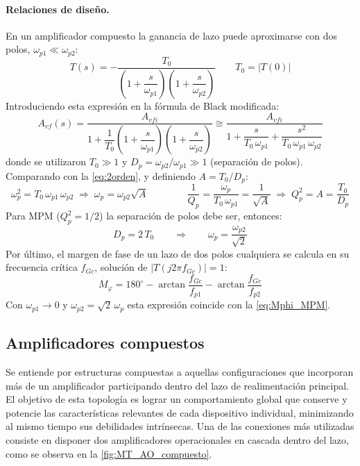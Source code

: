 \paragraph{Relaciones de diseño.} En un amplificador compuesto la ganancia de lazo puede aproximarse con dos polos, $\omega_{p1} \ll \omega_{p2}$:
\begin{equation}
    T(s) = - \frac{T_0}{\left(1 + \dfrac{s}{\omega_{p1}}\right)\left(1 + \dfrac{s}{\omega_{p2}}\right)} \qquad T_0 = |T(0)|
    \label{eq:lazo2polos}
\end{equation}
Introduciendo esta expresión en la fórmula de Black modificada:
\begin{equation}
    A_{vf}(s) = \frac{A_{vfi}}{1 + \dfrac{1}{T_0}\left(1+\dfrac{s}{\omega_{p1}}\right)\left(1+\dfrac{s}{\omega_{p2}}\right)} \cong \frac{A_{vfi}}{1 + \dfrac{s}{T_0\,\omega_{p1}} + \dfrac{s^2}{T_0\,\omega_{p1}\,\omega_{p2}}}
    \label{eq:Avf_dospolos}
\end{equation}
donde se utilizaron $T_0 \gg 1$ y $D_p = \omega_{p2}/\omega_{p1} \gg 1$ (separación de polos). Comparando con la \autoref{eq:2orden}, y definiendo $A = T_0/D_p$:
\begin{equation}
    \omega_p^2 = T_0\,\omega_{p1}\,\omega_{p2} \;\Rightarrow\; \omega_p = \omega_{p2}\sqrt{A} \qquad\qquad \frac{1}{Q_p} = \frac{\omega_p}{T_0\,\omega_{p1}} = \frac{1}{\sqrt{A}} \;\Rightarrow\; Q_p^2 = A = \frac{T_0}{D_p}
    \label{eq:wp_A}
\end{equation}
Para MPM ($Q_p^2 = 1/2$) la separación de polos debe ser, entonces:
\begin{equation}
    D_p = 2\,T_0 \qquad\Rightarrow\qquad \omega_p = \frac{\omega_{p2}}{\sqrt{2}}
    \label{eq:Dp_MPM}
\end{equation}
Por último, el margen de fase de un lazo de dos polos cualquiera se calcula en su frecuencia crítica $f_{Gc}$, solución de $|T(j2\pi f_{Gc})| = 1$:
\begin{equation}
    M_\varphi = 180^\circ - \arctan\frac{f_{Gc}}{f_{p1}} - \arctan\frac{f_{Gc}}{f_{p2}}
    \label{eq:Mphi_2polos}
\end{equation}
Con $\omega_{p1}\to 0$ y $\omega_{p2} = \sqrt{2}\,\omega_p$ esta expresión coincide con la \autoref{eq:Mphi_MPM}.

\subsection{Amplificadores compuestos}

Se entiende por estructuras compuestas a aquellas configuraciones que incorporan más de un amplificador participando dentro del lazo de realimentación principal. El objetivo de esta topología es lograr un comportamiento global que conserve y potencie las características relevantes de cada dispositivo individual, minimizando al mismo tiempo sus debilidades intrínsecas. Una de las conexiones más utilizadas consiste en disponer dos amplificadores operacionales en cascada dentro del lazo, como se observa en la \autoref{fig:MT_AO_compuesto}.


